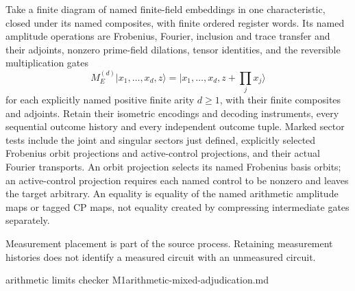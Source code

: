 \begin{definition}
Take a finite diagram of named finite-field embeddings in one
characteristic, closed under its named composites, with finite ordered
register words. Its named amplitude operations are Frobenius, Fourier,
inclusion and trace transfer and their adjoints, nonzero prime-field
dilations, tensor identities, and the reversible multiplication gates
\[
 M_E^{(d)}|x_1,\ldots,x_d,z\rangle
 =|x_1,\ldots,x_d,z+\textstyle\prod_jx_j\rangle
\]
for each explicitly named positive finite arity $d\geq1$, with their finite composites and
adjoints. Retain their isometric encodings and decoding instruments,
every sequential outcome history and every independent outcome tuple.
Marked sector tests include the joint and singular sectors just defined,
explicitly selected Frobenius orbit projections and active-control
projections, and their actual Fourier transports. An orbit projection
selects its named Frobenius basis orbits; an active-control projection
requires each named control to be nonzero and leaves the target arbitrary.
An equality is equality of the named arithmetic amplitude maps or tagged
CP maps, not equality created by compressing intermediate gates separately.
\end{definition}
\begin{scope}
Measurement placement is part of the source process. Retaining measurement
histories does not identify a measured circuit with an unmeasured circuit.
\end{scope}
{arithmetic limits checker M1}{arithmetic-mixed-adjudication.md}

